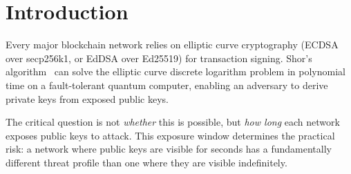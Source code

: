 \section{Introduction}


Every major blockchain network relies on elliptic curve cryptography
(ECDSA over secp256k1, or EdDSA over Ed25519) for transaction signing.
Shor's algorithm~\cite{shor1999} can solve the elliptic curve discrete
logarithm problem in polynomial time on a fault-tolerant quantum
computer, enabling an adversary to derive private keys from exposed
public keys.

The critical question is not \emph{whether} this is possible, but
\emph{how long} each network exposes public keys to attack. This
exposure window determines the practical risk: a network where public
keys are visible for seconds has a fundamentally different threat
profile than one where they are visible indefinitely.


